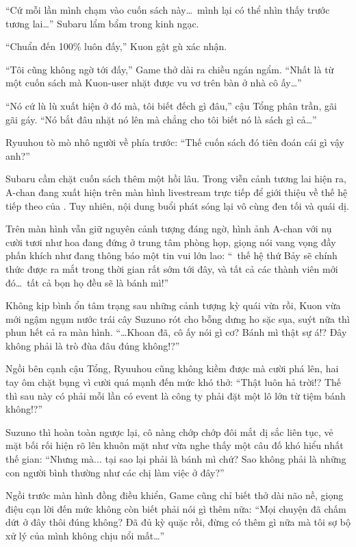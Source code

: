 \documentclass[../main.tex]{subfiles}
\begin{document}
``Cứ mỗi lần mình chạm vào cuốn sách này\dots\ mình lại có thể nhìn thấy trước tương lai\dots'' Subaru lẩm bẩm trong kinh ngạc.

``Chuẩn đến 100\% luôn đấy,'' Kuon gật gù xác nhận.

``Tôi cũng không ngờ tới đấy,'' Game thở dài ra chiều ngán ngẩm. ``Nhất là từ một cuốn sách mà Kuon-user nhặt được vu vơ trên bàn ở nhà cô ấy\dots''

``Nó cứ lù lù xuất hiện ở đó mà, tôi biết đếch gì đâu,'' cậu Tổng phân trần, gãi gãi gáy. ``Nó bắt đâu nhặt nó lên mà chẳng cho tôi biết nó là sách gì cả\dots''

Ryuuhou tò mò nhô người về phía trước: ``Thế cuốn sách đó tiên đoán cái gì vậy anh?''

Subaru cầm chặt cuốn sách thêm một hồi lâu. Trong viễn cảnh tương lai hiện ra, A-chan đang xuất hiện trên màn hình livestream trực tiếp để giới thiệu về thế hệ tiếp theo của \hll. Tuy nhiên, nội dung buổi phát sóng lại vô cùng đen tối và quái dị.

Trên màn hình vẫn giữ nguyên cảnh tượng đáng ngờ, hình ảnh A-chan với nụ cười tươi như hoa đang đứng ở trung tâm phòng họp, giọng nói vang vọng đầy phấn khích như đang thông báo một tin vui lớn lao: ``\hll\ thế hệ thứ Bảy sẽ chính thức được ra mắt trong thời gian rất sớm tới đây, và tất cả các thành viên mới đó\dots\ tất cả bọn họ đều sẽ là bánh mì!''


Không kịp bình ổn tâm trạng sau những cảnh tượng kỳ quái vừa rồi, Kuon vừa mới ngậm ngụm nước trái cây Suzuno rót cho bỗng dưng ho sặc sụa, suýt nữa thì phun hết cả ra màn hình. ``\dots Khoan đã, cô ấy nói gì cơ? Bánh mì thật sự á!? Đây không phải là trò đùa đâu đúng không!?''

Ngồi bên cạnh cậu Tổng, Ryuuhou cũng không kiềm được mà cười phá lên, hai tay ôm chặt bụng vì cười quá mạnh đến mức khó thở: ``Thật luôn hả trời!? Thế thì sau này có phải mỗi lần có event là công ty phải đặt một lô lớn từ tiệm bánh không!?''

Suzuno thì hoàn toàn ngược lại, cô nàng chớp chớp đôi mắt dị sắc liên tục, vẻ mặt bối rối hiện rõ lên khuôn mặt như vừa nghe thấy một câu đố khó hiểu nhất thế gian: ``Nhưng mà... tại sao lại phải là bánh mì chứ? Sao không phải là những con người bình thường như các chị làm việc ở đây?''

Ngồi trước màn hình đồng điều khiển, Game cũng chỉ biết thở dài não nề, giọng điệu cạn lời đến mức không còn biết phải nói gì thêm nữa: ``Mọi chuyện đã chấm dứt ở đây thôi đúng không? Đã đủ kỳ quặc rồi, đừng có thêm gì nữa mà tôi sợ bộ xử lý của mình không chịu nổi mất\dots''
\end{document}
